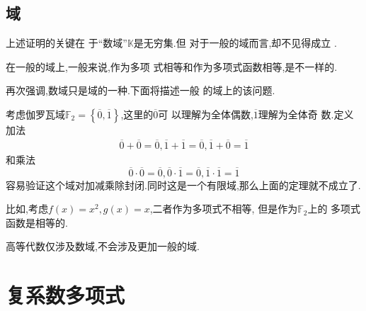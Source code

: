\subsection{域}
\begin{red}
\begin{remark}
    上述证明的关键在
    于“数域”$\mathbb{K}$是无穷集.但
    对于一般的域而言,却不见得成立
    .
    
    在一般的域上,一般来说,作为多项
    式相等和作为多项式函数相等,是不一样的.
\end{remark}
\end{red}
\begin{red}
\begin{remark}
    再次强调,数域只是域的一种.下面将描述一般
    的域上的该问题.
\end{remark}
\end{red}
\begin{brown}
\begin{example}
    考虑伽罗瓦域$\mathbb{F}_2=\left\{\overline{0},\overline{1}\right\}$,这里的$\overline{0}$可
    以理解为全体偶数,$\overline{1}$理解为全体奇
    数.定义加法
    \begin{align*}
        \overline{0}+\overline{0}=\overline{0},\overline{1}+\overline{1}=\overline{0},\overline{1}+\overline{0}=\overline{1}
    \end{align*}
    和乘法
    \[
    \overline{0}\cdot \overline{0}=\overline{0},
    \overline{0}\cdot \overline{1}=\overline{0},
    \overline{1}\cdot\overline{1}=\overline{1}
    \]
    容易验证这个域对加减乘除封闭.同时这是一个有限域,那么上面的定理就不成立了.

    比如,考虑$f\left(x\right)=x^2,g\left(x\right)=x$,二者作为多项式不相等,
    但是作为$\mathbb{F}_2$上的
    多项式函数是相等的.
\end{example}
\end{brown}
\begin{red}
\begin{remark}
    高等代数仅涉及数域,不会涉及更加一般的域.
\end{remark}
\end{red}
\newpage
\section{复系数多项式}
